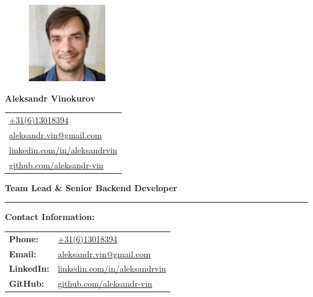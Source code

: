 \documentclass[letterpaper, 11pt]{article}
\begin{document}
\begin{figure} %
  \vspace{-5ex} %
  \includegraphics[width=0.3\textwidth]{me.jpg} %
\end{figure}

\noindent\textbf{\Huge Aleksandr Vinokurov}

\vspace{1em}

\noindent
\begin{tabular}{@{\hspace{5mm}}l}
\href{tel:+31613018394}{\url{+31(6)13018394}} \\
\href{mailto:aleksandr.vin@gmail.com}{\url{aleksandr.vin@gmail.com}} \\
\href{https://linkedin.com/in/aleksandrvin}{\url{linkedin.com/in/aleksandrvin}} \\
\href{https://github.com/aleksandr-vin}{\url{github.com/aleksandr-vin}}
\end{tabular}

\vspace{1em}

\noindent\parbox{\linewidth}{\raggedright\textbf{\Large Team Lead \& Senior Backend Developer}} %

\vspace{1em}













\vspace{5em}
\hrule
\vspace{1em}

\noindent
\textbf{Contact Information:}

\vspace{1em}

\begin{tabular}{ll}
  \textbf{Phone:} & \href{tel:+31613018394}{\url{+31(6)13018394}} \\
  \textbf{Email:} & \href{mailto:aleksandr.vin@gmail.com}{\url{aleksandr.vin@gmail.com}} \\
  \textbf{LinkedIn:} & \href{https://linkedin.com/in/aleksandrvin}{\url{linkedin.com/in/aleksandrvin}} \\
  \textbf{GitHub:} & \href{https://github.com/aleksandr-vin}{\url{github.com/aleksandr-vin}}
\end{tabular}
\end{document}
